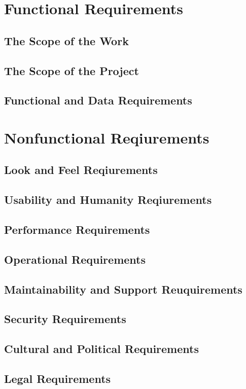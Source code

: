 \documentclass{article}
\begin{document}
\newpage
\section{Functional Requirements}

\subsection{The Scope of the Work}
\subsection{The Scope of the Project}
\subsection{Functional and Data Requirements }

\newpage
\section{Nonfunctional Reqiurements}

\subsection{Look and Feel Reqiurements}
\subsection{Usability and Humanity Reqiurements}
\subsection{Performance Requirements}
\subsection{Operational Requirements}
\subsection{Maintainability and Support Reuquirements}
\subsection{Security Requirements}
\subsection{Cultural and Political Requirements}
\subsection{Legal Requirements}
\end{document}
